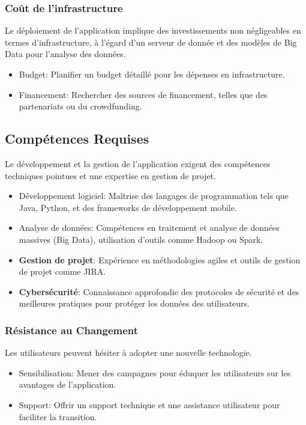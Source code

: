 \documentclass{article}
\begin{document}
\subsubsection*{Coût de l'infrastructure}
Le déploiement de l'application implique des investissements non négligeables en termes d'infrastructure, à l'égard d'un serveur de donnée et des modèles de Big Data pour l'analyse des données.
\begin{itemize}
    \item Budget: Planifier un budget détaillé pour les dépenses en infrastructure.
    \item Financement: Rechercher des sources de financement, telles que des partenariats ou du crowdfunding.
\end{itemize}

\subsection*{Compétences Requises}
Le développement et la gestion de l'application exigent des compétences techniques pointues et une expertise en gestion de projet.
\begin{itemize}
    \item Développement logiciel: Maîtrise des langages de programmation tels que Java, Python, et des frameworks de développement mobile.
    \item Analyse de données: Compétences en traitement et analyse de données massives (Big Data), utilisation d'outils comme Hadoop ou Spark.
    \item \textbf{Gestion de projet}: Expérience en méthodologies agiles et outils de gestion de projet comme JIRA.
    \item \textbf{Cybersécurité}: Connaissance approfondie des protocoles de sécurité et des meilleures pratiques pour protéger les données des utilisateurs.
\end{itemize}

\subsubsection*{Résistance au Changement}
Les utilisateurs peuvent hésiter à adopter une nouvelle technologie.
\begin{itemize}
    \item Sensibilisation: Mener des campagnes pour éduquer les utilisateurs sur les avantages de l'application.
    \item Support: Offrir un support technique et une assistance utilisateur pour faciliter la transition.
\end{itemize}
\end{document}
